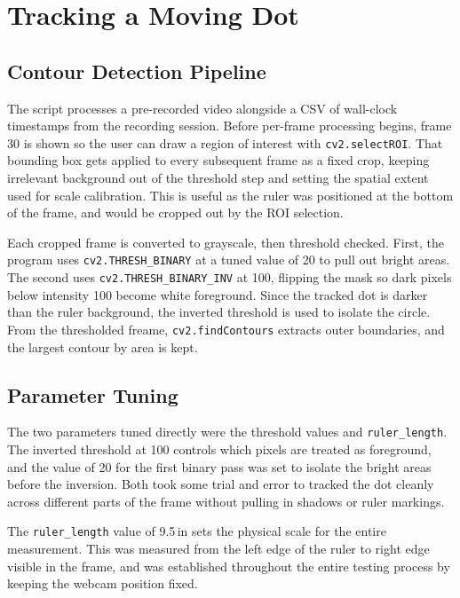\documentclass{article}
\begin{document}
\section{Tracking a Moving Dot}

\subsection{Contour Detection Pipeline}

The script processes a pre-recorded video alongside a CSV of wall-clock timestamps from the recording session. Before per-frame processing begins, frame 30 is shown so the user can draw a region of interest with \texttt{cv2.selectROI}. That bounding box gets applied to every subsequent frame as a fixed crop, keeping irrelevant background out of the threshold step and setting the spatial extent used for scale calibration. This is useful as the ruler was positioned at the bottom of the frame, and would be cropped out by the ROI selection.

Each cropped frame is converted to grayscale, then threshold checked. First, the program uses \texttt{cv2.THRESH\_BINARY} at a tuned value of 20 to pull out bright areas. The second uses \texttt{cv2.THRESH\_BINARY\_INV} at 100, flipping the mask so dark pixels below intensity 100 become white foreground. Since the tracked dot is darker than the ruler background, the inverted threshold is used to isolate the circle. From the thresholded freame, \texttt{cv2.findContours} extracts outer boundaries, and the largest contour by area is kept.

\subsection{Parameter Tuning}

The two parameters tuned directly were the threshold values and \texttt{ruler\_length}. The inverted threshold at 100 controls which pixels are treated as foreground, and the value of 20 for the first binary pass was set to isolate the bright areas before the inversion. Both took some trial and error to tracked the dot cleanly across different parts of the frame without pulling in shadows or ruler markings.

The \texttt{ruler\_length} value of 9.5\,in sets the physical scale for the entire measurement. This was measured from the left edge of the ruler to right edge visible in the frame, and was established throughout the entire testing process by keeping the webcam position fixed.
\end{document}
